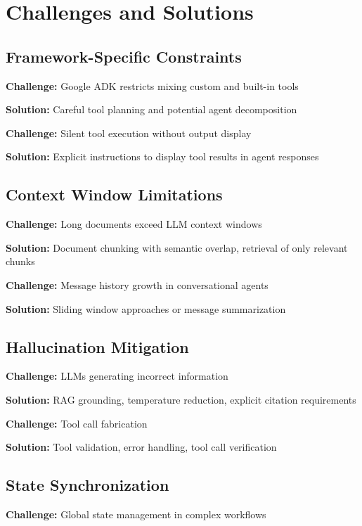 \documentclass[12pt,a4paper]{article}
\begin{document}
\section{Challenges and Solutions}

\subsection{Framework-Specific Constraints}

\textbf{Challenge:} Google ADK restricts mixing custom and built-in tools

\textbf{Solution:} Careful tool planning and potential agent decomposition

\textbf{Challenge:} Silent tool execution without output display

\textbf{Solution:} Explicit instructions to display tool results in agent responses

\subsection{Context Window Limitations}

\textbf{Challenge:} Long documents exceed LLM context windows

\textbf{Solution:} Document chunking with semantic overlap, retrieval of only relevant chunks

\textbf{Challenge:} Message history growth in conversational agents

\textbf{Solution:} Sliding window approaches or message summarization

\subsection{Hallucination Mitigation}

\textbf{Challenge:} LLMs generating incorrect information

\textbf{Solution:} RAG grounding, temperature reduction, explicit citation requirements

\textbf{Challenge:} Tool call fabrication

\textbf{Solution:} Tool validation, error handling, tool call verification

\subsection{State Synchronization}

\textbf{Challenge:} Global state management in complex workflows
\end{document}
